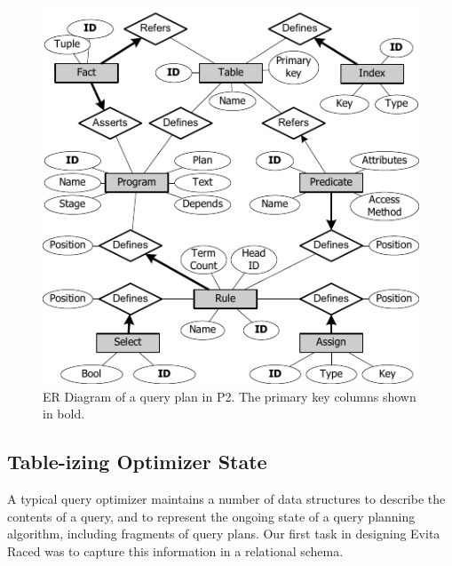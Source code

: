\begin{figure}
\ssp
\begin{center}
\includegraphics[scale=1.2]{figures/ERDiagram}
\caption{ER Diagram of a query plan in P2. The primary key columns shown in bold.}
\label{ch:evita:fig:p2er}
\end{center}
\end{figure}

\subsection{Table-izing Optimizer State} 
\label{ch:evita:sec:catalog}

A typical query optimizer maintains a number of data structures to describe the
contents of a query, and to represent the ongoing state of a query planning
algorithm, including fragments of query plans.  Our first task in designing
Evita Raced was to capture this information in a relational schema.

